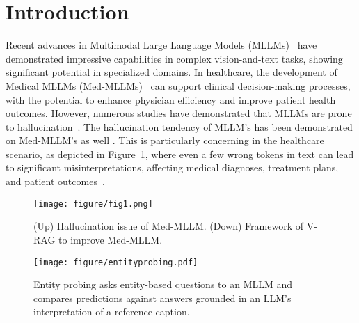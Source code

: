 \section{Introduction}
Recent advances in Multimodal Large Language Models (MLLMs)~\cite{Achiam2023GPT4TR, Liu2023ImprovedBW} have demonstrated impressive capabilities in complex vision-and-text tasks, showing significant potential in specialized domains.
In healthcare, the development of Medical MLLMs (Med-MLLMs)~\cite{Li2023LLaVAMedTA, Wu2023TowardsGF} can support clinical decision-making processes, with the potential to enhance physician efficiency and improve patient health outcomes.
However, numerous studies have demonstrated that MLLMs are prone to hallucination~\cite{Li2023EvaluatingOH, Bai2024HallucinationOM, Huang2024VisualHO}.
The hallucination tendency of MLLM's has been demonstrated on Med-MLLM's
as well \citep{wu2024hallucinationbenchmarkmedicalvisual}.
This is particularly concerning in the healthcare scenario, as depicted in Figure~\ref{fig:fig1}, where even a few wrong tokens in text can lead to significant misinterpretations, affecting medical diagnoses, treatment plans, and patient outcomes~\cite{Pal2024GeminiGT}.

\begin{figure}[t]
    \centering
    \setlength{\abovecaptionskip}{1mm}
    \texttt{[image: figure/fig1.png]}
    \caption{(Up) Hallucination issue of Med-MLLM. (Down) Framework of V-RAG to improve Med-MLLM.}
    \vspace{-5mm}
    \label{fig:fig1}
\end{figure}


\begin{figure}[t]
\centering
    \setlength{\abovecaptionskip}{1mm}
    \texttt{[image: figure/entityprobing.pdf]}
    \caption{Entity probing asks entity-based questions to an MLLM and compares predictions against answers grounded in an LLM's interpretation of a reference caption.}
    \vspace{-5mm}
    \label{fig:entityprobing}
\end{figure}

